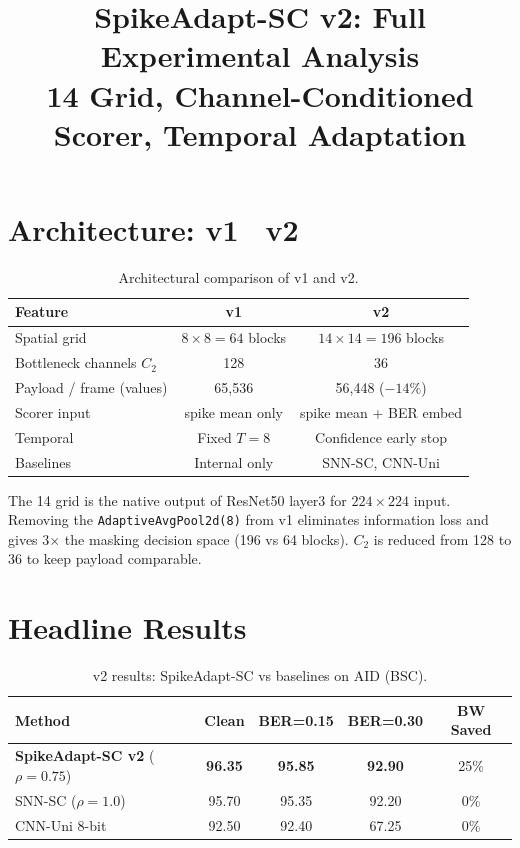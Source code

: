 \documentclass[conference]{IEEEtran}
\begin{document}
\title{SpikeAdapt-SC v2: Full Experimental Analysis\\
\large{14 Grid, Channel-Conditioned Scorer, Temporal Adaptation}}
\maketitle

\section{Architecture: v1 \textrightarrow\ v2}

\begin{table}[h]
\centering
\caption{Architectural comparison of v1 and v2.}
\begin{tabular}{@{}l c c@{}}
\toprule
\textbf{Feature} & \textbf{v1} & \textbf{v2} \\
\midrule
Spatial grid & $8{\times}8 = 64$ blocks & $14{\times}14 = 196$ blocks \\
Bottleneck channels $C_2$ & 128 & 36 \\
Payload / frame (values) & 65,536 & 56,448 ($-14\%$) \\
Scorer input & spike mean only & spike mean + BER embed \\
Temporal & Fixed $T{=}8$ & Confidence early stop \\
Baselines & Internal only & SNN-SC, CNN-Uni \\
\bottomrule
\end{tabular}
\end{table}

The 14 grid is the native output of ResNet50 layer3 for $224{\times}224$ input. Removing the \texttt{AdaptiveAvgPool2d(8)} from v1 eliminates information loss and gives 3$\times$ the masking decision space (196 vs 64 blocks). $C_2$ is reduced from 128 to 36 to keep payload comparable.


\section{Headline Results}

\begin{table}[h]
\centering
\caption{v2 results: SpikeAdapt-SC vs baselines on AID (BSC).}
\begin{tabular}{@{}l c c c c@{}}
\toprule
\textbf{Method} & \textbf{Clean} & \textbf{BER=0.15} & \textbf{BER=0.30} & \textbf{BW Saved} \\
\midrule
\textbf{SpikeAdapt-SC v2} ($\rho{=}0.75$) & \textbf{96.35} & \textbf{95.85} & \textbf{92.90} & 25\% \\
SNN-SC ($\rho{=}1.0$) & 95.70 & 95.35 & 92.20 & 0\% \\
CNN-Uni 8-bit & 92.50 & 92.40 & 67.25 & 0\% \\
\bottomrule
\end{tabular}
\end{table}
\end{document}
